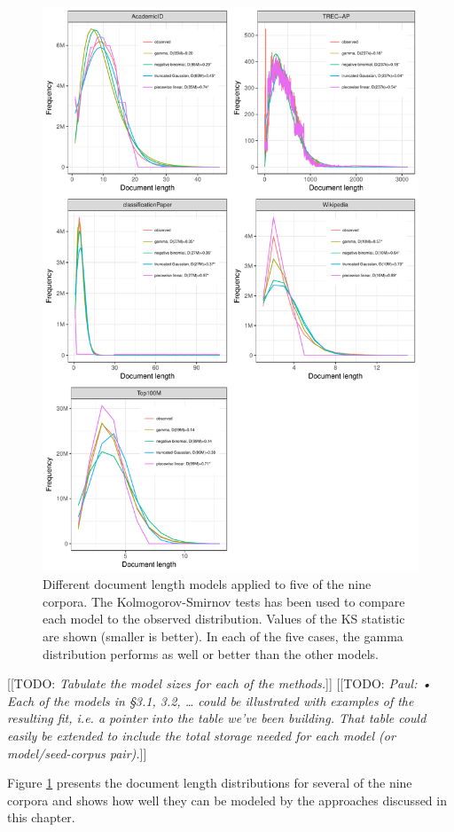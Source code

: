 \documentclass[11pt]{report}
\newcommand{\todo}[1]{{\color{blue}[[TODO: {\emph{#1}}]]}}
\begin{document}
\begin{figure}[p]
\label{figure-docLengthFitting}
    \includegraphics[width=0.8951\linewidth]{plots-pathom/doclenhist/doclen-dists.pdf}
\caption{Different document length models applied to
  five of the nine corpora.  The Kolmogorov-Smirnov tests has been
  used to compare each model to the observed distribution.  Values of
  the KS statistic are shown (smaller is better).  In each of the five
cases, the gamma distribution performs as well or better than the
other models.}
\end{figure}  

\todo{Tabulate the model sizes for each of the methods.}
\todo{Paul: •	Each of the models in §3.1, 3.2, … could be illustrated with examples of the resulting fit, i.e. a pointer into the table we’ve been building. That table could easily be extended to include the total storage needed for each model (or model/seed-corpus pair).}

Figure \ref{figure-docLengthFitting} presents the document length
distributions for several of the nine corpora and shows how well they
can be modeled by the approaches discussed in this chapter.
\end{document}
